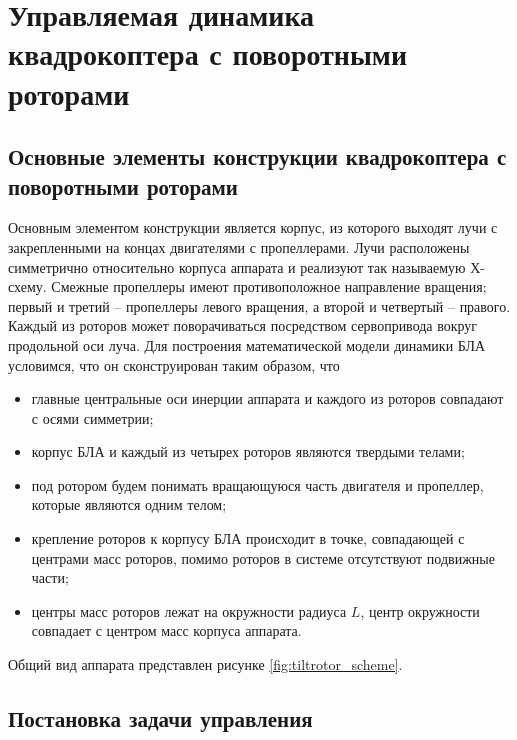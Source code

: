
\chapter{Управляемая динамика квадрокоптера с поворотными роторами}

\section{Основные элементы конструкции квадрокоптера с поворотными роторами}

Основным элементом конструкции является корпус, из которого выходят лучи с закрепленными на концах двигателями с пропеллерами. Лучи расположены симметрично относительно корпуса аппарата и реализуют так называемую Х-схему. Смежные пропеллеры имеют противоположное направление вращения; первый и третий – пропеллеры левого вращения, а второй и четвертый – правого. Каждый из роторов может поворачиваться посредством сервопривода вокруг продольной оси луча. Для построения математической модели динамики БЛА условимся, что он сконструирован таким образом, что
\begin{itemize}
	\item главные центральные оси инерции аппарата и каждого из роторов совпадают с осями симметрии; 
	\item корпус БЛА и каждый из четырех роторов являются твердыми телами; 
	\item под ротором будем понимать вращающуюся часть двигателя и пропеллер, которые являются одним телом; 
	\item крепление роторов к корпусу БЛА происходит в точке, совпадающей с центрами масс роторов, помимо роторов в системе отсутствуют подвижные части;
	\item центры масс роторов лежат на окружности радиуса $L$, центр окружности совпадает с центром масс корпуса аппарата.
\end{itemize}
Общий вид аппарата представлен рисунке \ref{fig:tiltrotor_scheme}.

\section{Постановка задачи управления}
\label{section_ctrl_task}

